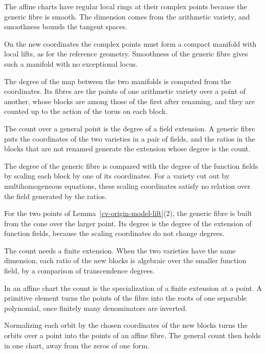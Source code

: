 The affine charts have regular local rings at their complex points because the generic fibre is smooth. The
dimension comes from the arithmetic variety, and smoothness bounds the tangent spaces.

On the new coordinates the complex points must form a compact manifold with local lifts, as for the reference
geometry. Smoothness of the generic fibre gives such a manifold with no exceptional locus.

The degree of the map between the two manifolds is computed from the coordinates. Its fibres are the points of one
arithmetic variety over a point of another, whose blocks are among those of the first after renaming, and they are
counted up to the action of the torus on each block.

The count over a general point is the degree of a field extension. A generic fibre puts the coordinates of the two
varieties in a pair of fields, and the ratios in the blocks that are not renamed generate the extension whose degree
is the count.

The degree of the generic fibre is compared with the degree of the function fields by scaling each block by one of
its coordinates. For a variety cut out by multihomogeneous equations, these scaling coordinates satisfy no relation
over the field generated by the ratios.

For the two points of Lemma~\ref{cv-origin-model-lift}(2), the generic fibre is built from the cone over the larger
point. Its degree is the degree of the extension of function fields, because the scaling coordinates do not change
degrees.

The count needs a finite extension. When the two varieties have the same dimension, each ratio of the new blocks is
algebraic over the smaller function field, by a comparison of transcendence degrees.

In an affine chart the count is the specialization of a finite extension at a point. A primitive element turns the
points of the fibre into the roots of one separable polynomial, once finitely many denominators are inverted.

Normalizing each orbit by the chosen coordinates of the new blocks turns the orbits over a point into the points of an
affine fibre. The general count then holds in one chart, away from the zeros of one form.

